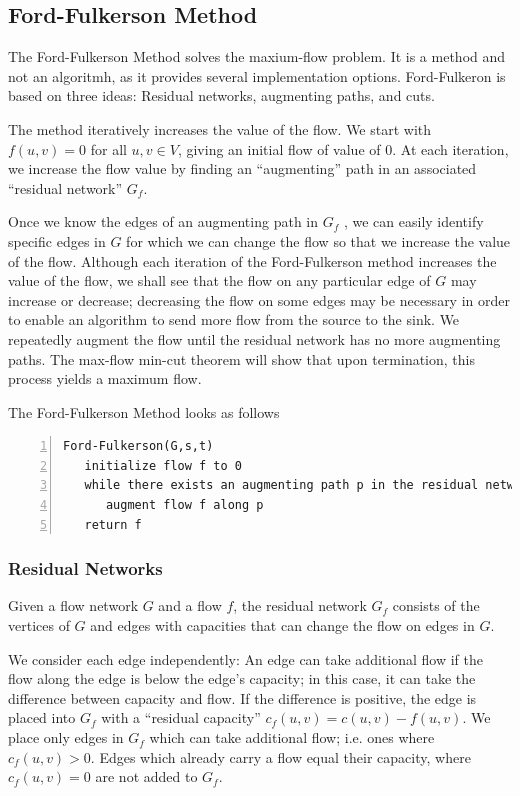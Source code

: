 \subsection{Ford-Fulkerson Method}

The Ford-Fulkerson Method solves the maxium-flow problem. It is a method and not an algoritmh, as it provides several implementation options. Ford-Fulkeron is based on three ideas: Residual networks, augmenting paths, and cuts.

The method iteratively increases the value of the flow. We start with $f(u,v)=0$ for all $u,v \in V$, giving an initial flow of value of $0$. At each iteration, we increase the flow value by finding an ``augmenting'' path in an associated ``residual network'' $G_f$.

Once we know the edges of an augmenting path in $G_f$ , we can easily identify speciﬁc edges in $G$ for which we can change the ﬂow so that we increase the value of the ﬂow. Although each iteration of the Ford-Fulkerson method increases the value of the ﬂow, we shall see that the ﬂow on any particular edge of $G$ may increase or decrease; decreasing the ﬂow on some edges may be necessary in order to enable an algorithm to send more ﬂow from the source to the sink. We repeatedly augment the ﬂow until the residual network has no more augmenting paths. The max-ﬂow min-cut theorem will show that upon termination, this process yields a maximum ﬂow.

The Ford-Fulkerson Method looks as follows

\begin{Verbatim}[numbers=left, xleftmargin=5mm]
Ford-Fulkerson(G,s,t)
   initialize flow f to 0
   while there exists an augmenting path p in the residual network G_f
      augment flow f along p
   return f
\end{Verbatim}


\subsubsection{Residual Networks}

Given a flow network $G$ and a flow $f$, the residual network $G_f$ consists of the vertices of $G$ and edges with capacities that can change the flow on edges in $G$.

We consider each edge independently: An edge can take additional flow if the flow along the edge is below the edge's capacity; in this case, it can take the difference between capacity and flow. If the difference is positive, the edge is placed into $G_f$ with a ``residual capacity'' $c_f(u,v) = c(u,v) - f(u,v)$. We place only edges in $G_f$ which can take additional flow; i.e. ones where $c_f(u,v) > 0$. Edges which already carry a flow equal their capacity, where $c_f(u,v) = 0$ are not added to $G_f$.

